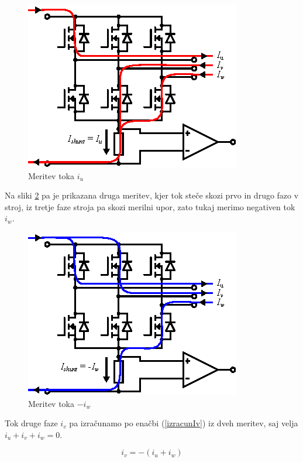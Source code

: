 \documentclass[a4paper,twoside,openright,12pt,slovene]{book}
\begin{document}
\begin{figure}[!htbp]
    \centering
    \includegraphics[width=0.8\columnwidth]{Slike/Inkscape/meritevTokaIu.eps}
    \caption{\label{meritevTokaIu} Meritev toka $i_u$ }
\end{figure}

Na sliki \ref{meritevTokaIw} pa je prikazana druga meritev, kjer tok steče skozi prvo in drugo fazo v stroj, iz tretje faze stroja pa skozi merilni upor, zato tukaj merimo negativen tok $i_w$. 

\begin{figure}[!htbp]
    \centering
    \includegraphics[width=0.8\columnwidth]{Slike/Inkscape/meritevTokaIw.eps}
    \caption{\label{meritevTokaIw} Meritev toka $-i_w$ }
\end{figure}

Tok druge faze $i_v$ pa izračunamo po enačbi (\ref{izracunIv}) iz dveh meritev, saj velja $i_u + i_v + i_w = 0$.

\begin{equation} \label{izracunIv}
i_v = -(i_u + i_w)
\end{equation}
\end{document}
